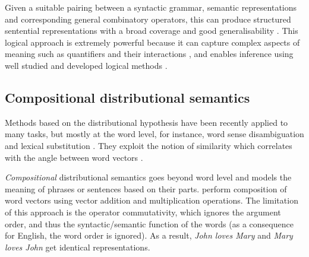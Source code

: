 Given a suitable pairing between a syntactic grammar, semantic representations and corresponding general combinatory operators, this can produce structured sentential representations with a broad coverage and good generalisability \cite{step2008:2222}. This logical approach is extremely powerful because it can capture complex aspects of meaning such as quantifiers and their interactions \cite{Copestake2005}, and enables inference using well studied and developed logical methods \cite{bos2000first}.

\subsection{Compositional distributional semantics}
\label{sec:composition}

Methods based on the distributional hypothesis have been recently applied to many tasks, but mostly at the word level, for instance, word sense disambiguation \cite{ZhitomirskyGeffet2009} and lexical substitution \cite{Thater:2010:CSR:1858681.1858778}. They exploit the notion of similarity which correlates with the angle between word vectors \cite{Turney:2010:FMV:1861751.1861756}.

\emph{Compositional} distributional semantics goes beyond word level and models the meaning of phrases or sentences based on their parts.  perform composition of word vectors using vector addition and multiplication operations. The limitation of this approach is the operator commutativity, which ignores the argument order, and thus the syntactic/semantic function of the words (as a consequence for English, the word order is ignored). As a result, \textit{John loves Mary} and \textit{Mary loves John} get identical representations.

